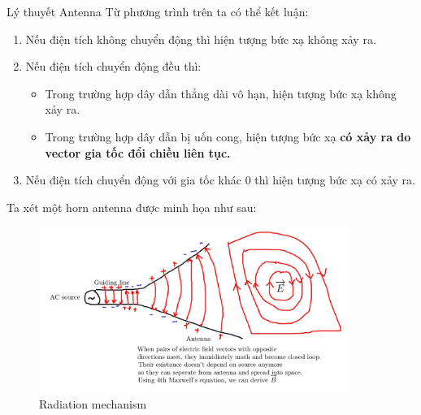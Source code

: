 \documentclass[8pt]{beamer}
\begin{document}
\begin{frame}{Lý thuyết Antenna}
Từ phương trình trên ta có thể kết luận:
\begin{enumerate}
	\item Nếu điện tích không chuyển động thì hiện tượng bức xạ không xảy ra. 
	\item Nếu điện tích chuyển động đều thì:
		\begin{itemize}
			\item Trong trường hợp dây dẫn thẳng dài vô hạn, hiện tượng bức xạ không xảy ra.
			\item \alert{Trong trường hợp dây dẫn bị uốn cong, hiện tượng bức xạ \textbf{có xảy ra do vector gia tốc đổi chiều liên tục.} }
		\end{itemize}
	\item Nếu điện tích chuyển động với gia tốc khác $0$ thì hiện tượng bức xạ có xảy ra.
\end{enumerate}
Ta xét một horn antenna được minh họa như sau:
\begin{figure}[h]
			\includegraphics[width=0.9\textwidth]{horn.jpg}
			\caption{Radiation mechanism}			\label{fig:re7}
\end{figure}

\end{frame}
\end{document}
